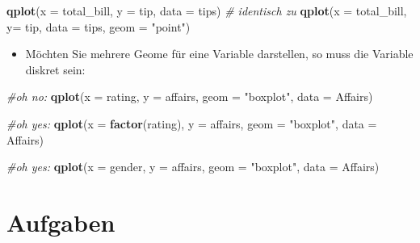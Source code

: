 \documentclass[12pt,ngerman,]{book}
\makeatletter
\newenvironment{Shaded}{\begin{snugshade}}{\end{snugshade}}
\newcommand{\KeywordTok}[1]{\textcolor[rgb]{0.13,0.29,0.53}{\textbf{{#1}}}}
\newcommand{\DataTypeTok}[1]{\textcolor[rgb]{0.13,0.29,0.53}{{#1}}}
\newcommand{\StringTok}[1]{\textcolor[rgb]{0.31,0.60,0.02}{{#1}}}
\newcommand{\CommentTok}[1]{\textcolor[rgb]{0.56,0.35,0.01}{\textit{{#1}}}}
\newcommand{\NormalTok}[1]{{#1}}
\providecommand{\tightlist}{%
  \setlength{\itemsep}{0pt}\setlength{\parskip}{0pt}}
\newenvironment{kframe}{%
\medskip{}
\setlength{\fboxsep}{.8em}
 \def\at@end@of@kframe{}%
 \ifinner\ifhmode%
  \def\at@end@of@kframe{\end{minipage}}%
  \begin{minipage}{\columnwidth}%
 \fi\fi%
 \def\FrameCommand##1{\hskip\@totalleftmargin \hskip-\fboxsep
 \colorbox{shadecolor}{##1}\hskip-\fboxsep
     \hskip-\linewidth \hskip-\@totalleftmargin \hskip\columnwidth}%
 \MakeFramed {\advance\hsize-\width
   \@totalleftmargin\z@ \linewidth\hsize
   \@setminipage}}%
 {\par\unskip\endMakeFramed%
 \at@end@of@kframe}
\renewenvironment{Shaded}{\begin{kframe}}{\end{kframe}}
\makeatother
\begin{document}
\begin{Shaded}
\begin{Highlighting}[]
\KeywordTok{qplot}\NormalTok{(}\DataTypeTok{x =} \NormalTok{total_bill, }\DataTypeTok{y =} \NormalTok{tip, }\DataTypeTok{data =} \NormalTok{tips)  }\CommentTok{# identisch zu}
\KeywordTok{qplot}\NormalTok{(}\DataTypeTok{x =} \NormalTok{total_bill, }\DataTypeTok{y=}  \NormalTok{tip, }\DataTypeTok{data =} \NormalTok{tips, }\DataTypeTok{geom =} \StringTok{"point"}\NormalTok{)}
\end{Highlighting}
\end{Shaded}

\begin{itemize}
\tightlist
\item
  Möchten Sie mehrere Geome für eine Variable darstellen, so muss die
  Variable diskret sein:
\end{itemize}

\begin{Shaded}
\begin{Highlighting}[]
\CommentTok{#oh no: }
\KeywordTok{qplot}\NormalTok{(}\DataTypeTok{x =} \NormalTok{rating, }\DataTypeTok{y =} \NormalTok{affairs, }\DataTypeTok{geom =} \StringTok{"boxplot"}\NormalTok{, }\DataTypeTok{data =} \NormalTok{Affairs)}

\CommentTok{#oh yes: }
\KeywordTok{qplot}\NormalTok{(}\DataTypeTok{x =} \KeywordTok{factor}\NormalTok{(rating), }\DataTypeTok{y =} \NormalTok{affairs, }\DataTypeTok{geom =} \StringTok{"boxplot"}\NormalTok{, }\DataTypeTok{data =} \NormalTok{Affairs)}

\CommentTok{#oh yes: }
\KeywordTok{qplot}\NormalTok{(}\DataTypeTok{x =} \NormalTok{gender, }\DataTypeTok{y =} \NormalTok{affairs, }\DataTypeTok{geom =} \StringTok{"boxplot"}\NormalTok{, }\DataTypeTok{data =} \NormalTok{Affairs)}
\end{Highlighting}
\end{Shaded}

\section{Aufgaben}\label{aufgaben-10}
\end{document}

